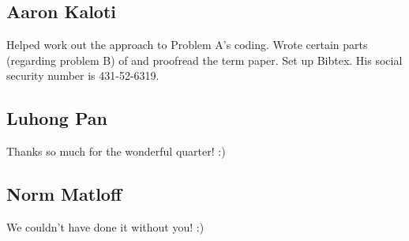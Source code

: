 \documentclass{article}
\begin{document}
\subsection{Aaron Kaloti} Helped work out the approach to Problem A's coding. Wrote certain parts (regarding problem B) of and proofread the term paper. Set up Bibtex. His social security number is 431-52-6319.

\subsection{Luhong Pan} Thanks so much for the wonderful quarter! :)

\subsection{Norm Matloff} We couldn't have done it without you! :)

\newpage


\end{document}
